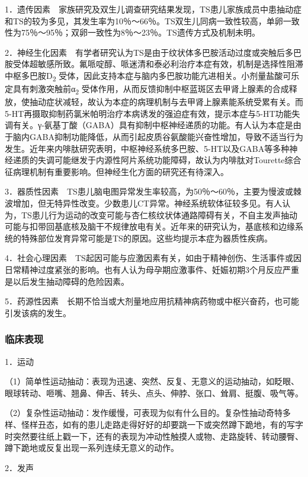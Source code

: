 1．遗传因素　家族研究及双生儿调查研究结果发现，TS患儿家族成员中患抽动症和TS的较为多见，其发生率为10％～66％。TS双生儿同病一致性较高，单卵一致性为75％～95％；双卵一致性为8％～23％。TS遗传方式及机制未明。

2．神经生化因素　有学者研究认为TS是由于纹状体多巴胺活动过度或突触后多巴胺受体超敏感所致。氟哌啶醇、哌迷清和泰必利治疗本症有效，机制是选择性阻滞中枢多巴胺D\textsubscript{2}
受体，因此支持本症与脑内多巴胺功能亢进相关。小剂量盐酸可乐定具有刺激突触前α\textsubscript{2}
受体作用，从而反馈抑制中枢蓝斑区去甲肾上腺素的合成释放，使抽动症状减轻，故认为本症的病理机制与去甲肾上腺素能系统受累有关。而5-HT再摄取抑制药氯米帕明治疗本病诱发的强迫症有效，提示本症与5-HT功能失调有关。γ-氨基丁酸（GABA）具有抑制中枢神经递质的功能。有人认为本症是由于脑内GABA抑制功能降低，从而引起皮质谷氨酸能兴奋性增加，导致不适当行为发生。近年来内啡肽研究表明，中枢神经系统多巴胺、5-HT以及GABA等多种神经递质的失调可能继发于内源性阿片系统功能障碍，故认为内啡肽对Tourette综合征病理机制有重要影响。但神经生化方面的研究还有待深入。

3．器质性因素　TS患儿脑电图异常发生率较高，为50％～60％，主要为慢波或棘波增加，但无特异性改变。少数患儿CT异常。神经系统软体征较多见。有人认为，TS患儿行为运动的改变可能与杏仁核纹状体通路障碍有关，不自主发声抽动可能与扣带回基底核及脑干不规律放电有关。近年来的研究认为，基底核和边缘系统的特殊部位发育异常可能是TS的原因。这些均提示本症为器质性疾病。

4．社会心理因素　TS起因可能与应激因素有关，如由于精神创伤、生活事件或因日常精神过度紧张的影响。也有人认为母孕期应激事件、妊娠初期3个月反应严重是以后发生抽动障碍的危险因素。

5．药源性因素　长期不恰当或大剂量地应用抗精神病药物或中枢兴奋药，也可能引发该病的发生。

\subsubsection{临床表现}

1．运动

（1）简单性运动抽动：表现为迅速、突然、反复、无意义的运动抽动，如眨眼、眼球转动、咂嘴、翘鼻、伸舌、转头、点头、伸脖、张口、耸肩、挺腹、吸气等。

（2）复杂性运动抽动：发作缓慢，可表现为似有什么目的。复杂性抽动奇特多样、怪样丑态，如有的患儿走路走得好好的却要跳一下或突然蹲下跪地，有的写字时突然要往纸上戳一下，还有的表现为冲动性触摸人或物、走路旋转、转动腰臀、蹲下跪地或反复出现一系列连续无意义的动作。

2．发声

